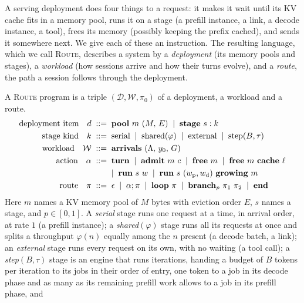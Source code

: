 A serving deployment does four things to a request: it makes it wait until its KV
cache fits in a memory pool, runs it on a stage (a prefill instance, a link, a decode
instance, a tool), frees its memory (possibly keeping the prefix cached), and sends it
somewhere next. We give each of these an instruction. The resulting language, which we
call \textsc{Route}, describes a system by a \emph{deployment} (its memory pools and
stages), a \emph{workload} (how sessions arrive and how their turns evolve), and a
\emph{route}, the path a session follows through the deployment.

\begin{definition}\label{L1:def:syntax}
A \textsc{Route} program is a triple $(\mathcal D,\mathcal W,\pi_0)$ of a deployment, a
workload and a route.
\begin{align*}
  \text{deployment item}\quad d \;&::=\; \kw{pool}\ m\ (M,\,E)
    \;\mid\; \kw{stage}\ s : k\\
  \text{stage kind}\quad k \;&::=\; \mathrm{serial} \;\mid\; \mathrm{shared}(\varphi)
    \;\mid\; \mathrm{external} \;\mid\; \mathrm{step}(B,\tau)\\
  \text{workload}\quad \mathcal W \;&::=\; \kw{arrivals}\ (\Lambda,\,y_0,\,G)\\
  \text{action}\quad \alpha \;&::=\; \kw{turn}
    \;\mid\; \kw{admit}\ m\ c
    \;\mid\; \kw{free}\ m
    \;\mid\; \kw{free}\ m\ \kw{cache}\ \ell\\
    &\phantom{::=}\;\;\mid\; \kw{run}\ s\ w
    \;\mid\; \kw{run}\ s\ (w_{\mathrm p}, w_{\mathrm d})\ \kw{growing}\ m\\
  \text{route}\quad \pi \;&::=\; \epsilon
    \;\mid\; \alpha;\pi
    \;\mid\; \kw{loop}\ \pi
    \;\mid\; \kw{branch}_p\ \pi_1\ \pi_2
    \;\mid\; \kw{end}
\end{align*}
Here $m$ names a KV memory pool of $M$ bytes with eviction order $E$, $s$ names a
stage, and $p\in[0,1]$. A \emph{serial} stage runs one request at a time, in arrival
order, at rate $1$ (a prefill instance); a \emph{shared}$(\varphi)$ stage runs all its
requests at once and splits a throughput $\varphi(n)$ equally among the $n$ present
(a decode batch, a link); an \emph{external} stage runs every request on its own, with
no waiting (a tool call); a \emph{step}$(B,\tau)$ stage is an engine that
runs iterations, handing a budget of $B$ tokens per iteration to its jobs
in their order of entry, one token to a job in its decode phase and as many
as its remaining prefill work allows to a job in its prefill phase, and

\end{definition}

